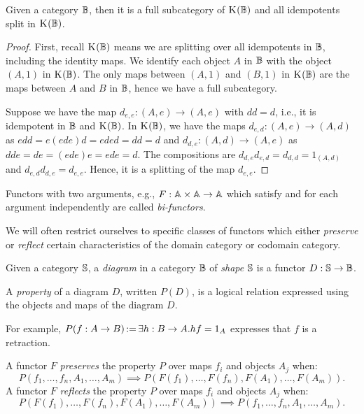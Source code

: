 \begin{lemma}\label{lem:split_category_splits_and_has_category}
  Given a category $\mathbb{B}$, then it is a full subcategory of $\text{K}_{}(\mathbb{B})$ and all idempotents split
  in  $\text{K}_{}(\mathbb{B})$.
\end{lemma}
\begin{proof}
  First, recall $\text{K}_{}(\mathbb{B})$ means we are splitting over all idempotents in $\mathbb{B}$, including the
  identity maps.
  We identify each object $A$ in $\mathbb{B}$ with the object $(A,1)$ in $\text{K}_{}(\mathbb{B})$. The only maps between
  $(A,1)$ and $(B,1)$ in $\text{K}_{}(\mathbb{B})$ are the maps between $A$ and $B$ in $\mathbb{B}$, hence we have a
  full subcategory.

  Suppose we have the map $d_{e,e}: (A,e) \to (A,e)$ with $d d = d$, i.e., it is idempotent in $\mathbb{B}$
  and $\text{K}_{}(\mathbb{B})$. In $\text{K}_{}(\mathbb{B})$, we have the maps $d_{e,d}:(A,e) \to (A,d)$  as
  $e d d = e (e d  e) d = e d e d = d d = d$ and
  $d_{d,e}:(A,d) \to (A,e)$ as $d d e = d e = (e d e) e = e d e = d$. The compositions
  are $d_{d,e} d_{e,d} = d_{d,d} = 1_{(A,d)}$ and $d_{e,d} d_{d,e} = d_{e,e}$. Hence,
  it is a splitting of the map  $d_{e,e}$.
\end{proof}


Functors with two arguments, e.g., $F:\mathbb{A} \times \mathbb{A} \to \mathbb{A}$ which satisfy  and
 for each argument independently are called \emph{bi-functors}.


We will often restrict ourselves to specific classes of functors which either \emph{preserve} or
\emph{reflect} certain characteristics of the domain category or codomain category.

\begin{definition}\label{def:diagram_in_a_category}
  Given a category $\mathbb{S}$, a \emph{diagram}
  in a category $\mathbb{B}$ of \emph{shape} $\mathbb{S}$ is a functor $D:\mathbb{S} \to \mathbb{B}$.
\end{definition}

\begin{definition}\label{def:property_of_a_diagram}
  A \emph{property} of a diagram $D$, written $P(D)$, is a logical relation expressed using the
  objects and maps of the diagram $D$.
\end{definition}

For example,   $P(f:A \to B) \operatorname*{:\!=} \exists h : B \to A. h f = 1_A$ expresses that $f$ is a retraction.

\begin{definition}\label{def:functor_preserving_and_reflecting_a_property}
  A functor $F$ \emph{preserves} the property $P$ over maps $f_i$ and objects $A_j$ when:
  \[
     P(f_1,\ldots,f_n, A_1,\ldots,A_m) \implies P(F(f_1),\ldots,F(f_n), F(A_1),\ldots,F(A_m)).
  \]
  A functor $F$ \emph{reflects} the property $P$ over maps $f_i$ and objects $A_j$ when:
  \[
    P(F(f_1),\ldots,F(f_n), F(A_1),\ldots,F(A_m)) \implies P(f_1,\ldots,f_n, A_1,\ldots,A_m).
  \]
\end{definition}

